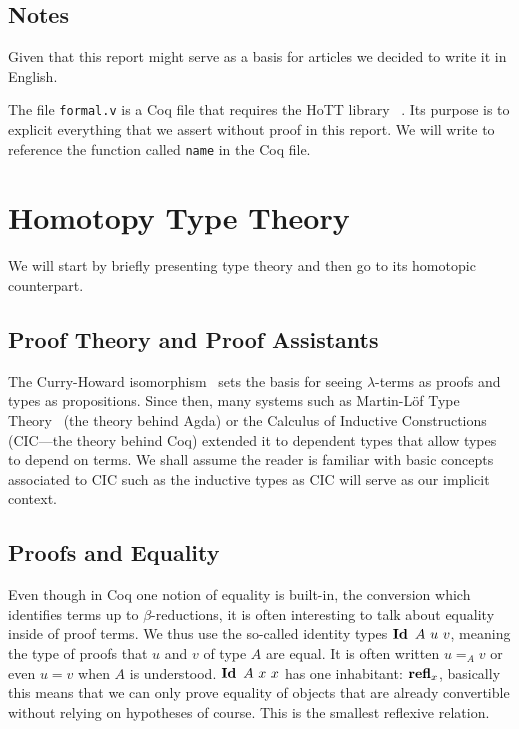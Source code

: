 \documentclass[11pt]{article}
\theoremstyle{plain}
\theoremstyle{remark}
\begin{document}
\subsection*{Notes}

Given that this report might serve as a basis for articles we decided to write
it in English.

The file \verb|formal.v| is a Coq file that requires the HoTT library\ %
\cite{HoTTlib}.
Its purpose is to explicit everything that we assert without proof in this
report. We will write  to reference the function called \verb|name|
in the Coq file.

\newpage
\pagestyle{plain} %

\section{Homotopy Type Theory}

We will start by briefly presenting type theory and then go to its homotopic
counterpart.

\subsection{Proof Theory and Proof Assistants}

The Curry-Howard isomorphism~\cite{howard1995formulae} sets the basis for seeing
$\lambda$-terms as proofs and types as propositions. Since then, many systems
such as Martin-L\" of Type Theory~\cite{manin1975intuitionistic} (the theory
behind Agda) or the Calculus of Inductive Constructions (CIC---the theory
behind Coq) extended it to dependent
types that allow types to depend on terms.
We shall assume the reader is familiar with basic concepts associated to CIC
such as the inductive types as CIC will serve as our implicit context.

\subsection{Proofs and Equality}

Even though in Coq one notion of equality is built-in, the conversion which
identifies terms up to $\beta$-reductions, it is often interesting to talk
about equality inside of proof terms.
We thus use the so-called identity types $\Id\ A\ u\ v$, meaning the type of
proofs that $u$ and $v$ of type $A$ are equal. It is often written
$u =_A v$ or even $u = v$ when $A$ is understood.
$\operatorname{\mathbf{Id}}\ A\ x\ x$ has one inhabitant: $\operatorname{\mathbf{refl}}_x$,
basically this means that we can only prove equality of objects that are already
convertible without relying on hypotheses of course. This is the smallest
reflexive relation.
\end{document}
